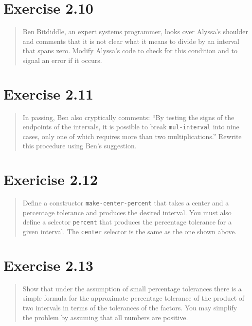 \documentclass{article}
\begin{document}
\section{Exercise 2.10}
\begin{quote}
    Ben Bitdiddle, an expert systems programmer, looks over Alyssa's shoulder
    and comments that it is not clear what it means to divide by an interval
    that spans zero. Modify Alyssa's code to check for this condition and to
    signal an error if it occurs.
\end{quote}



\section{Exercise 2.11}
\begin{quote}
    In passing, Ben also cryptically comments: “By testing the signs of the
    endpoints of the intervals, it is possible to break \texttt{mul-interval}
    into nine cases, only one of which requires more than two multiplications.”
    Rewrite this procedure using Ben’s suggestion.
\end{quote}



\section{Exericise 2.12}
\begin{quote}
    Define a constructor \texttt{make-center-percent} that takes a center and a
    percentage tolerance and produces the desired interval. You must also
    define a selector \texttt{percent} that produces the percentage tolerance
    for a given interval. The \texttt{center} selector is the same as the one
    shown above.
\end{quote}



\section{Exercise 2.13}
\begin{quote}
    Show that under the assumption of small percentage tolerances there is a
    simple formula for the approximate percentage tolerance of the product of
    two intervals in terms of the tolerances of the factors. You may simplify
    the problem by assuming that all numbers are positive.
\end{quote}
\end{document}
